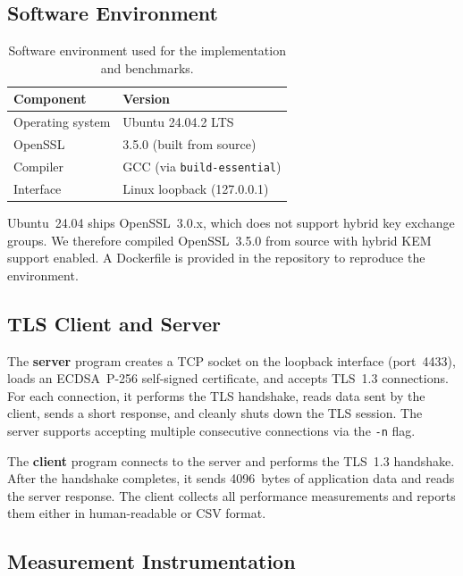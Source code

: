 \documentclass[11pt,a4paper]{article}
\begin{document}
\subsection{Software Environment}

\begin{table}[h]
\centering
\begin{tabular}{ll}
\toprule
\textbf{Component} & \textbf{Version} \\
\midrule
Operating system & Ubuntu 24.04.2 LTS \\
OpenSSL         & 3.5.0 (built from source) \\
Compiler        & GCC (via \texttt{build-essential}) \\
Interface       & Linux loopback (127.0.0.1) \\
\bottomrule
\end{tabular}
\caption{Software environment used for the implementation and benchmarks.}
\label{tab:environment}
\end{table}

Ubuntu~24.04 ships OpenSSL~3.0.x, which does not support hybrid key exchange groups. We therefore compiled OpenSSL~3.5.0 from source with hybrid KEM support enabled. A Dockerfile is provided in the repository to reproduce the environment.

\subsection{TLS Client and Server}

The \textbf{server} program creates a TCP socket on the loopback interface (port~4433), loads an ECDSA~P-256 self-signed certificate, and accepts TLS~1.3 connections. For each connection, it performs the TLS handshake, reads data sent by the client, sends a short response, and cleanly shuts down the TLS session. The server supports accepting multiple consecutive connections via the \texttt{-n} flag.

The \textbf{client} program connects to the server and performs the TLS~1.3 handshake. After the handshake completes, it sends 4096~bytes of application data and reads the server response. The client collects all performance measurements and reports them either in human-readable or CSV format.

\subsection{Measurement Instrumentation}
\end{document}
